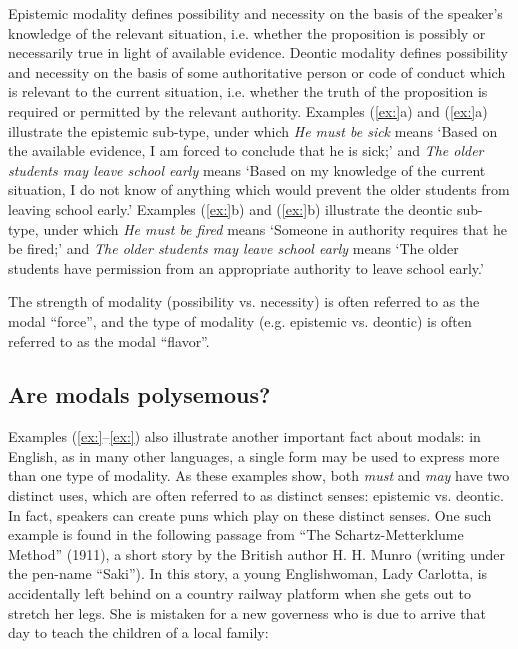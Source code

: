 Epistemic modality defines possibility and necessity on the basis of the speaker’s knowledge of the relevant situation, i.e. whether the proposition is possibly or necessarily true in light of available evidence. Deontic modality defines possibility and necessity on the basis of some authoritative person or code of conduct which is relevant to the current situation, i.e. whether the truth of the proposition is required or permitted by the relevant authority. Examples (\ref{ex:}a) and (\ref{ex:}a) illustrate the epistemic sub-type, under which \textit{He must be sick} means ‘Based on the available evidence, I am forced to conclude that he is sick;’ and \textit{The older students may leave school early} means ‘Based on my knowledge of the current situation, I do not know of anything which would prevent the older students from leaving school early.’ Examples (\ref{ex:}b) and (\ref{ex:}b) illustrate the deontic sub-type, under which \textit{He must be fired} means ‘Someone in authority requires that he be fired;’ and \textit{The older students may leave school early} means ‘The older students have permission from an appropriate authority to leave school early.’



The strength of modality (possibility vs. necessity) is often referred to as the modal “force”, and the type of modality (e.g. epistemic vs. deontic) is often referred to as the modal “flavor”.


\subsection{Are modals polysemous?}\label{sec:16.2.1}

Examples (\ref{ex:}--\ref{ex:}) also illustrate another important fact about modals: in English, as in many other languages, a single form may be used to express more than one type of modality. As these examples show, both \textit{must} and \textit{may} have two distinct uses, which are often referred to as distinct senses: epistemic vs. deontic. In fact, speakers can create puns which play on these distinct senses. One such example is found in the following passage from “The Schartz-Metterklume Method” (1911), a short story by the British author H. H. Munro (writing under the pen-name “Saki”). In this story, a young Englishwoman, Lady Carlotta, is accidentally left behind on a country railway platform when she gets out to stretch her legs. She is mistaken for a new governess who is due to arrive that day to teach the children of a local family:


